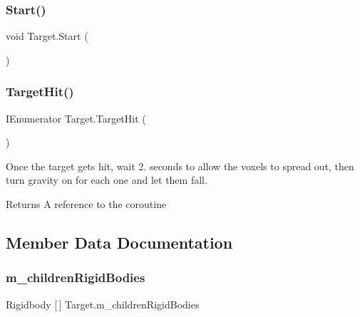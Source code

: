 \mbox{\label{class_target_a0f01237749302a315f5f9427524ac45a}} 
\subsubsection{\texorpdfstring{Start()}{Start()}}
{\footnotesize\ttfamily void Target.\+Start (\begin{DoxyParamCaption}{ }\end{DoxyParamCaption})\hspace{0.3cm}{\ttfamily [private]}}

\mbox{\label{class_target_af48513275b10a25477fb07f499a4b596}} 
\subsubsection{\texorpdfstring{Target\+Hit()}{TargetHit()}}
{\footnotesize\ttfamily I\+Enumerator Target.\+Target\+Hit (\begin{DoxyParamCaption}{ }\end{DoxyParamCaption})\hspace{0.3cm}{\ttfamily [private]}}



Once the target gets hit, wait 2. seconds to allow the voxels to spread out, then turn gravity on for each one and let them fall. 

\begin{DoxyReturn}{Returns}
A reference to the coroutine
\end{DoxyReturn}


\subsection{Member Data Documentation}
\mbox{\label{class_target_a570a932db2872d5f0d00656f038c2f21}} 
\subsubsection{\texorpdfstring{m\+\_\+children\+Rigid\+Bodies}{m\_childrenRigidBodies}}
{\footnotesize\ttfamily Rigidbody \mbox{[}$\,$\mbox{]} Target.\+m\+\_\+children\+Rigid\+Bodies\hspace{0.3cm}{\ttfamily [private]}}

